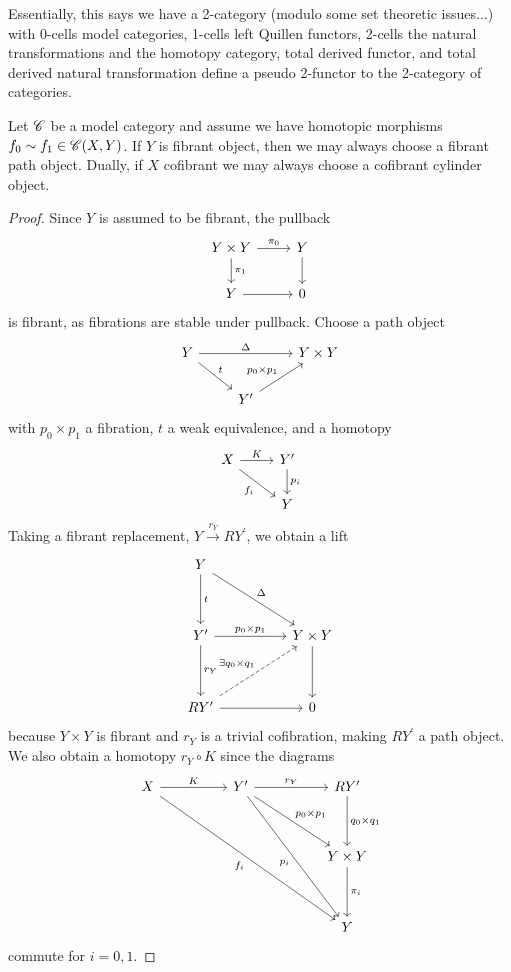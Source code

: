 \documentclass[10pt]{amsart}
\begin{document}
\begin{rmk}
  Essentially, this says we have a 2-category (modulo some set theoretic issues...) with 0-cells model categories, 1-cells left Quillen functors, 2-cells the natural transformations and the homotopy category, total derived functor, and total derived natural transformation define a pseudo 2-functor to the 2-category of categories.
\end{rmk}

\begin{lem}
  Let $\mathscr{C}$ be a model category and assume we have homotopic morphisms $f_0 \sim f_1 \in \mathscr{C}(X,Y)$.
  If $Y$ is fibrant object, then we may always choose a fibrant path object.
  Dually, if $X$ cofibrant we may always choose a cofibrant cylinder object.
  
  \begin{proof}
    Since $Y$ is assumed to be fibrant, the pullback
    $$\begin{tikzcd}
      Y \times Y \arrow{r}{\pi_0}\arrow{d}{\pi_1} & Y\arrow{d}\\
      Y \arrow{r} & 0
    \end{tikzcd}$$
    is fibrant, as fibrations are stable under pullback.
    Choose a path object
    $$\begin{tikzcd}
      Y \arrow{rr}{\Delta}\arrow{rd}{t} & & Y \times Y\\
      & Y^\prime \arrow{ur}{p_0 \times p_1}
    \end{tikzcd}$$
    with $p_0 \times p_1$ a fibration, $t$ a weak equivalence, and a homotopy
    $$\begin{tikzcd}
      X \arrow{r}{K}\arrow[swap]{rd}{f_i} & Y^\prime \arrow{d}{p_i}\\
      & Y
    \end{tikzcd}$$
    Taking a fibrant replacement, $Y \overset{r_Y}\to RY^\prime$, we obtain a lift
    $$\begin{tikzcd}
      Y \arrow{dd}{t} \arrow{rrdd}{\Delta}\\
      \\
      Y^\prime \arrow{dd}{r_Y}\arrow{rr}{p_0 \times p_1} && Y \times Y\arrow{dd}\\
      \\
      RY^\prime \arrow{rr}\arrow[dashed]{uurr}{\exists q_0 \times q_1} && 0
    \end{tikzcd}$$
    because $Y \times Y$ is fibrant and $r_Y$ is a trivial cofibration, making $RY^\prime$ a path object.
    We also obtain a homotopy $r_Y \circ K$ since the diagrams
    $$\begin{tikzcd}
      X \arrow{rr}{K}\arrow[swap]{rrrrdddd}{f_i} 
      && 
      Y^\prime \arrow{rr}{r_Y}\arrow{rrdd}{p_0 \times p_1}\arrow[swap]{rrdddd}{p_i} 
      && 
      RY^\prime\arrow{dd}{q_0 \times q_1}\\
      \\
      & & & & Y \times Y \arrow{dd}{\pi_i}\\
      \\
      & & & & Y
    \end{tikzcd}$$
    commute for $i = 0, 1$.
  \end{proof}
\end{lem}
\end{document}
